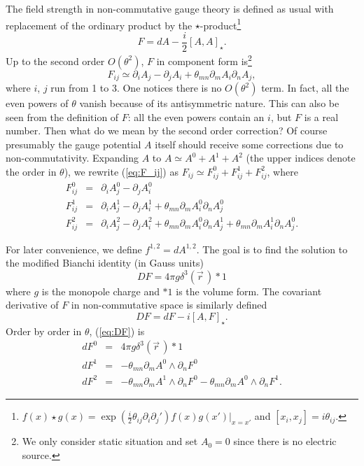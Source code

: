 \documentclass[a4paper,12pt]{article}
\begin{document}
The f\mbox{}ield strength in non-commutative gauge theory is 
def\mbox{}ined as usual 
with replacement of the ordinary product by the $\star$-product\footnote{
$f(x)\star g(x)=\exp (\frac{i}{2}\theta_{ij}\partial_i\partial_j')
               f(x)g(x')|_{x=x'}$ and $[x_i, x_j]=i\theta_{ij}$.}
\begin{equation}
F=dA-\frac{i}{2}[A, A]_{\star}.
\end{equation}       
Up to the second order $O(\theta ^2)$, $F$ in component form 
is\footnote{We only consider static situation and set $A_0=0$ since there
is no electric source.}
\begin{equation} \label{eq:F_ij}
F_{ij}\simeq \partial_i A_j-\partial_j A_i+\theta_{mn}\partial_m A_i
                                                \partial_n A_j,
\end{equation}    
where $i$, $j$ run from 1 to 3. One notices there is no $O(\theta ^2)$ term.
In fact, all the even powers of $\theta$ vanish because of its antisymmetric
nature. This can also be seen from the def\mbox{}inition of $F$: 
all the even powers
contain an $i$, but $F$ is a real number. Then what do we mean by the second
order correction? Of course presumably the gauge potential $A$ itself should
receive some corrections due to non-commutativity. Expanding $A$ to 
$A\simeq A^0+A^1+A^2$ (the upper indices denote the order in $\theta$), we 
rewrite (\ref{eq:F_ij}) as $F_{ij}\simeq F_{ij}^0+F_{ij}^1+F_{ij}^2$, where
{\setlength\arraycolsep{2pt}
\begin{eqnarray}
F_{ij}^0 & = & \partial_i A_j^0-\partial_j A_i^0 \nonumber\\
F_{ij}^1 & = & \partial_i A_j^1-\partial_j A_i^1+\theta_{mn}\partial_m A_i^0
                                       \partial_n A_j^0   \\
F_{ij}^2 & = & \partial_i A_j^2-\partial_j A_i^2+\theta_{mn}\partial_m A_i^0
    \partial_n A_j^1+\theta_{mn}\partial_m A_i^1 \partial_n A_j^0. \nonumber
\end{eqnarray}}

\vskip -0.5cm
\noindent For later convenience, we def\mbox{}ine $f^{1, 2}=dA^{1, 2}$. 
The goal is 
to f\mbox{}ind the solution to the modif\mbox{}ied Bianchi 
identity (in Gauss units)
\begin{equation} \label{eq:DF}
DF=4\pi g\delta^3(\vec r\,)\ast\!1
\end{equation}
where $g$ is the monopole charge and $\ast1$ is the volume form. The
covariant derivative of $F$ in non-commutative space is similarly 
def\mbox{}ined
\begin{equation}
DF=dF-i[A, F]_{\star}.
\end{equation}
Order by order in $\theta$, (\ref{eq:DF}) is
{\setlength\arraycolsep{2pt}
\begin{eqnarray}
dF^0 & = & 4\pi g\delta^3(\vec r\,)\ast\!1 \nonumber\\
dF^1 & = & -\theta_{mn}\partial_m A^0\wedge \partial_n F^0 \\
dF^2 & = & -\theta_{mn}\partial_m A^1\wedge \partial_n F^0
           -\theta_{mn}\partial_m A^0\wedge \partial_n F^1. \nonumber
\end{eqnarray}}
\end{document}
